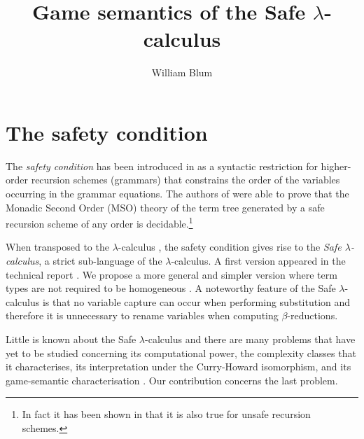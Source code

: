 
\newtheorem{thm}{Theorem}
\newtheorem{cor}{Corollary}



\title{Game semantics of the Safe $\lambda$-calculus}

\author{William Blum}

\maketitle

\vspace{0.5cm}

\section{The safety condition}

\noindent The \emph{safety condition} has been introduced in
\cite{KNU02} as a syntactic restriction for higher-order recursion
schemes (grammars) that constrains the order of the variables
occurring in the grammar equations. The authors of \cite{KNU02} were
able to prove that the Monadic Second Order (MSO) theory of the term
tree generated by a safe recursion scheme of any order is
decidable.\footnote{In fact it has been shown in \cite{OngLics2006}
that it is also true for unsafe recursion schemes.}

When transposed to the $\lambda$-calculus \cite{Barendregt84}, the
safety condition gives rise to the \emph{Safe $\lambda$-calculus}, a
strict sub-language of the $\lambda$-calculus. A first version
appeared in the technical report \cite{safety-mirlong2004}. We
propose a more general and simpler version where term types are not
required to be homogeneous \cite{blumtransfer}. A noteworthy feature
of the Safe $\lambda$-calculus is that no variable capture can occur
when performing substitution and therefore it is unnecessary to
rename variables when computing $\beta$-reductions.

Little is known about the Safe $\lambda$-calculus and there are many
 problems that have yet to be studied concerning its
computational power, the complexity classes that it characterises,
its interpretation under the Curry-Howard isomorphism, and its
game-semantic characterisation
\cite{abramsky:game-semantics-tutorial}. Our contribution concerns
the last problem.

